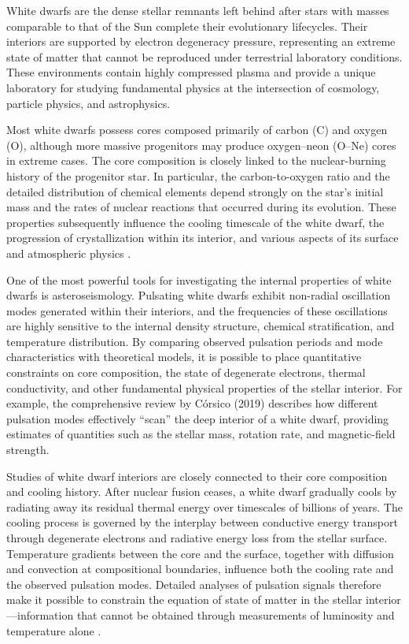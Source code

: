 White dwarfs are the dense stellar remnants left behind after stars with masses comparable to that of the Sun complete their evolutionary lifecycles. Their interiors are supported by electron degeneracy pressure, representing an extreme state of matter that cannot be reproduced under terrestrial laboratory conditions. These environments contain highly compressed plasma and provide a unique laboratory for studying fundamental physics at the intersection of cosmology, particle physics, and astrophysics.

Most white dwarfs possess cores composed primarily of carbon (C) and oxygen (O), although more massive progenitors may produce oxygen--neon (O--Ne) cores in extreme cases. The core composition is closely linked to the nuclear-burning history of the progenitor star. In particular, the carbon-to-oxygen ratio and the detailed distribution of chemical elements depend strongly on the star's initial mass and the rates of nuclear reactions that occurred during its evolution. These properties subsequently influence the cooling timescale of the white dwarf, the progression of crystallization within its interior, and various aspects of its surface and atmospheric physics \cite{salaris1997}.

One of the most powerful tools for investigating the internal properties of white dwarfs is asteroseismology. Pulsating white dwarfs exhibit non-radial oscillation modes generated within their interiors, and the frequencies of these oscillations are highly sensitive to the internal density structure, chemical stratification, and temperature distribution. By comparing observed pulsation periods and mode characteristics with theoretical models, it is possible to place quantitative constraints on core composition, the state of degenerate electrons, thermal conductivity, and other fundamental physical properties of the stellar interior. For example, the comprehensive review by Córsico (2019) \cite{corsico2019} describes how different pulsation modes effectively ``scan'' the deep interior of a white dwarf, providing estimates of quantities such as the stellar mass, rotation rate, and magnetic-field strength.

Studies of white dwarf interiors are closely connected to their core composition and cooling history. After nuclear fusion ceases, a white dwarf gradually cools by radiating away its residual thermal energy over timescales of billions of years. The cooling process is governed by the interplay between conductive energy transport through degenerate electrons and radiative energy loss from the stellar surface. Temperature gradients between the core and the surface, together with diffusion and convection at compositional boundaries, influence both the cooling rate and the observed pulsation modes. Detailed analyses of pulsation signals therefore make it possible to constrain the equation of state of matter in the stellar interior---information that cannot be obtained through measurements of luminosity and temperature alone \cite{bedard2024}.

